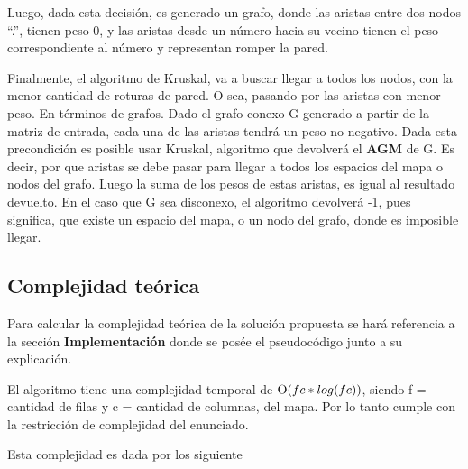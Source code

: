 	Luego, dada esta decisión, es generado un grafo, donde las aristas entre dos nodos “.”, tienen peso 0, y las aristas desde un número hacia su vecino tienen el peso correspondiente al número y representan romper la pared.

	Finalmente, el algoritmo de Kruskal, va a buscar llegar a todos los nodos, con la menor cantidad de roturas de pared. O sea, pasando por las aristas con menor peso. En términos de grafos. Dado el grafo conexo G generado a partir de la matriz de entrada, cada una de las aristas tendrá un peso no negativo. Dada esta precondición es posible usar Kruskal, algoritmo que devolverá el \textbf{AGM} de G. Es decir, por que aristas se debe pasar para llegar a todos los espacios del mapa o nodos del grafo. Luego la suma de los pesos de estas aristas, es igual al resultado devuelto. En el caso que G sea disconexo, el algoritmo devolverá -1, pues significa, que existe un espacio del mapa, o un nodo del grafo, donde es imposible llegar.


	\subsection{Complejidad teórica}

	Para calcular la complejidad teórica de la solución propuesta se hará
	referencia a la sección \textbf{Implementación} donde se posée el pseudocódigo junto a
	su explicación.

	El algoritmo tiene una complejidad temporal de $\operatorname{O}(fc*log(fc))$, siendo f = cantidad de filas y c = cantidad de columnas, del mapa.
	Por lo tanto cumple con la restricción de complejidad del enunciado. \par

	Esta complejidad es dada por los siguiente

